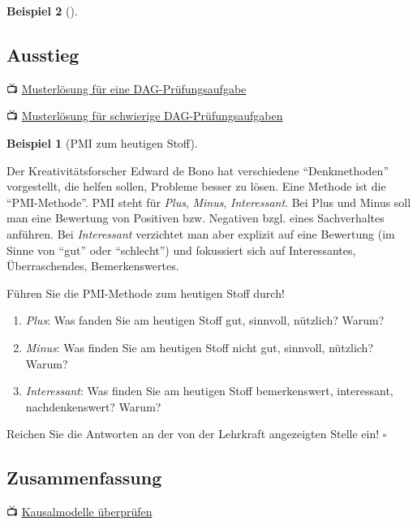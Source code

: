 \documentclass[
  ngerman,
  letterpaper,
  twoside,
  open=any]{scrbook}
\providecommand{\tightlist}{%
  \setlength{\itemsep}{0pt}\setlength{\parskip}{0pt}}\usepackage{longtable,booktabs,array}
\theoremstyle{definition}
\newtheorem{example}{Beispiel}[chapter]
\theoremstyle{plain}
\theoremstyle{definition}
\theoremstyle{definition}
\theoremstyle{remark}
\begin{document}
\begin{example}[]
\subsection{Ausstieg}\label{ausstieg-2}

📺 \href{https://www.youtube.com/watch?v=lHUEURFjW78}{Musterlösung für
eine DAG-Prüfungsaufgabe}

📺 \href{https://www.youtube.com/watch?v=5HKmOdzuDXw}{Musterlösung für
schwierige DAG-Prüfungsaufgaben}

\begin{example}[PMI zum heutigen
Stoff]\protect\hypertarget{exm-pmi-kausal1}{}\label{exm-pmi-kausal1}

Der Kreativitätsforscher Edward de Bono hat verschiedene
\enquote{Denkmethoden} vorgestellt, die helfen sollen, Probleme besser
zu lösen. Eine Methode ist die \enquote{PMI-Methode}. PMI steht für
\emph{Plus}, \emph{Minus}, \emph{Interessant}. Bei Plus und Minus soll
man eine Bewertung von Positiven bzw. Negativen bzgl. eines
Sachverhaltes anführen. Bei \emph{Interessant} verzichtet man aber
explizit auf eine Bewertung (im Sinne von \enquote{gut} oder
\enquote{schlecht}) und fokussiert sich auf Interessantes,
Überraschendes, Bemerkenswertes.

Führen Sie die PMI-Methode zum heutigen Stoff durch!

\begin{enumerate}
\def\labelenumi{\arabic{enumi}.}
\tightlist
\item
  \emph{Plus}: Was fanden Sie am heutigen Stoff gut, sinnvoll, nützlich?
  Warum?
\item
  \emph{Minus}: Was finden Sie am heutigen Stoff nicht gut, sinnvoll,
  nützlich? Warum?
\item
  \emph{Interessant}: Was finden Sie am heutigen Stoff bemerkenswert,
  interessant, nachdenkenswert? Warum?
\end{enumerate}

Reichen Sie die Antworten an der von der Lehrkraft angezeigten Stelle
ein! \(\square\)

\end{example}

\subsection{Zusammenfassung}\label{zusammenfassung-3}

📺 \href{https://www.youtube.com/watch?v=JEHgAJEdIa0}{Kausalmodelle
überprüfen}


\end{example}
\end{document}
